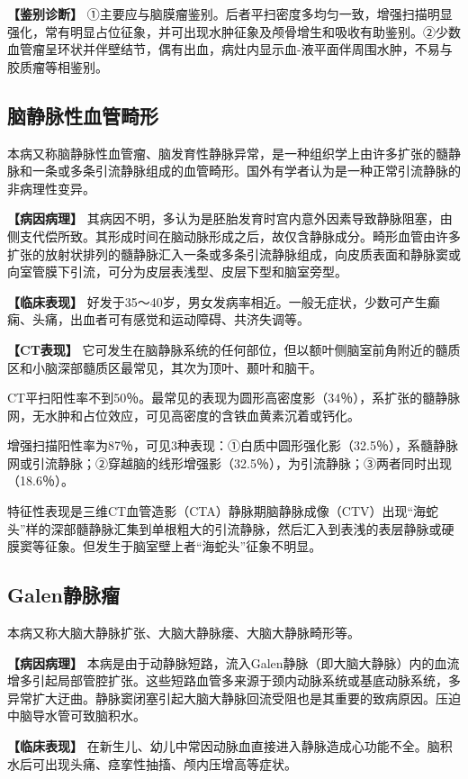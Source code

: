 \textbf{【鉴别诊断】}
①主要应与脑膜瘤鉴别。后者平扫密度多均匀一致，增强扫描明显强化，常有明显占位征象，并可出现水肿征象及颅骨增生和吸收有助鉴别。②少数血管瘤呈环状并伴壁结节，偶有出血，病灶内显示血-液平面伴周围水肿，不易与胶质瘤等相鉴别。

\subsection{脑静脉性血管畸形}

本病又称脑静脉性血管瘤、脑发育性静脉异常，是一种组织学上由许多扩张的髓静脉和一条或多条引流静脉组成的血管畸形。国外有学者认为是一种正常引流静脉的非病理性变异。

\textbf{【病因病理】}
其病因不明，多认为是胚胎发育时宫内意外因素导致静脉阻塞，由侧支代偿所致。其形成时间在脑动脉形成之后，故仅含静脉成分。畸形血管由许多扩张的放射状排列的髓静脉汇入一条或多条引流静脉组成，向皮质表面和静脉窦或向室管膜下引流，可分为皮层表浅型、皮层下型和脑室旁型。

\textbf{【临床表现】}
好发于35～40岁，男女发病率相近。一般无症状，少数可产生癫痫、头痛，出血者可有感觉和运动障碍、共济失调等。

\textbf{【CT表现】}
它可发生在脑静脉系统的任何部位，但以额叶侧脑室前角附近的髓质区和小脑深部髓质区最常见，其次为顶叶、颞叶和脑干。

CT平扫阳性率不到50％。最常见的表现为圆形高密度影（34％），系扩张的髓静脉网，无水肿和占位效应，可见高密度的含铁血黄素沉着或钙化。

增强扫描阳性率为87％，可见3种表现：①白质中圆形强化影（32.5％），系髓静脉网或引流静脉；②穿越脑的线形增强影（32.5％），为引流静脉；③两者同时出现（18.6％）。

特征性表现是三维CT血管造影（CTA）静脉期脑静脉成像（CTV）出现“海蛇头”样的深部髓静脉汇集到单根粗大的引流静脉，然后汇入到表浅的表层静脉或硬膜窦等征象。但发生于脑室壁上者“海蛇头”征象不明显。

\subsection{Galen静脉瘤}

本病又称大脑大静脉扩张、大脑大静脉瘘、大脑大静脉畸形等。

\textbf{【病因病理】}
本病是由于动静脉短路，流入Galen静脉（即大脑大静脉）内的血流增多引起局部管腔扩张。这些短路血管多来源于颈内动脉系统或基底动脉系统，多异常扩大迂曲。静脉窦闭塞引起大脑大静脉回流受阻也是其重要的致病原因。压迫中脑导水管可致脑积水。

\textbf{【临床表现】}
在新生儿、幼儿中常因动脉血直接进入静脉造成心功能不全。脑积水后可出现头痛、痉挛性抽搐、颅内压增高等症状。


